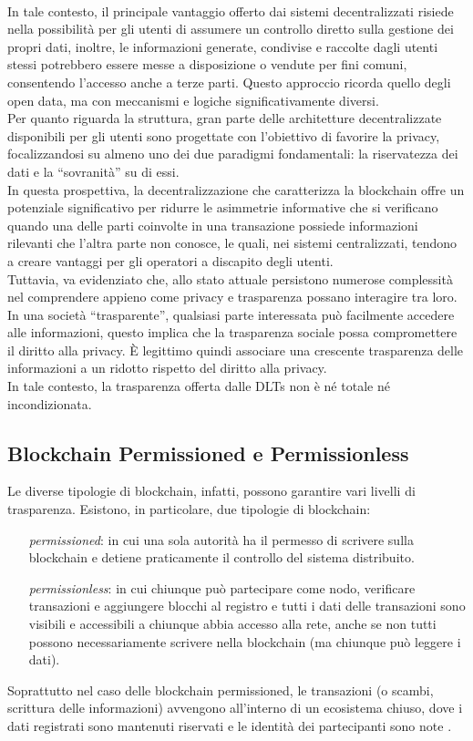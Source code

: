 \\In tale contesto, il principale vantaggio offerto dai sistemi decentralizzati risiede nella possibilità per gli utenti di assumere un controllo diretto sulla gestione dei propri dati, inoltre, le informazioni generate, condivise e raccolte dagli utenti stessi potrebbero essere messe a disposizione o vendute per fini comuni,
consentendo l'accesso anche a terze parti. Questo approccio ricorda quello degli open data, ma con meccanismi e logiche significativamente diversi.
\\Per quanto riguarda la struttura, gran parte delle architetture decentralizzate disponibili per gli utenti sono progettate con l'obiettivo di favorire la privacy, focalizzandosi su almeno uno dei due paradigmi fondamentali: la riservatezza dei dati e la “sovranità” su di essi.
\\In questa prospettiva, la decentralizzazione che caratterizza la blockchain offre un potenziale significativo per ridurre le asimmetrie informative che si verificano quando una delle parti coinvolte in una transazione possiede informazioni rilevanti che l'altra parte non conosce, le quali, nei sistemi centralizzati, tendono a creare vantaggi per gli operatori a discapito degli utenti.
\\Tuttavia, va evidenziato che, allo stato attuale persistono numerose complessità nel comprendere appieno come privacy e trasparenza possano interagire tra loro.
\\In una società “trasparente”, qualsiasi parte interessata può facilmente accedere alle informazioni, questo implica che la trasparenza sociale possa compromettere il diritto alla privacy. \`E legittimo quindi associare una crescente trasparenza delle informazioni a un ridotto rispetto del diritto alla privacy.
\\In tale contesto, la trasparenza offerta dalle DLTs non è né totale né incondizionata. 

\subsection{Blockchain Permissioned e Permissionless}
Le diverse tipologie di blockchain, infatti, possono garantire vari livelli di trasparenza. Esistono, in particolare, due tipologie di blockchain: 
\begin{itemize}
    \item [\textit{permissioned}:] in cui una sola autorità ha il permesso di scrivere sulla blockchain e detiene praticamente il controllo del sistema distribuito.
    \item [\textit{permissionless}:] in cui chiunque può partecipare come nodo, verificare transazioni e aggiungere blocchi al registro e tutti i dati delle transazioni sono visibili e accessibili a chiunque abbia accesso alla rete, anche se non tutti possono necessariamente scrivere nella blockchain (ma chiunque può leggere i dati).
\end{itemize}
Soprattutto nel caso delle blockchain permissioned, le transazioni (o scambi, scrittura delle informazioni) avvengono all’interno di un ecosistema chiuso, dove i dati registrati sono mantenuti riservati e le identità dei partecipanti sono note \cite{Blockchain_tecnologia_e_applicazioni_per_il_business}.
